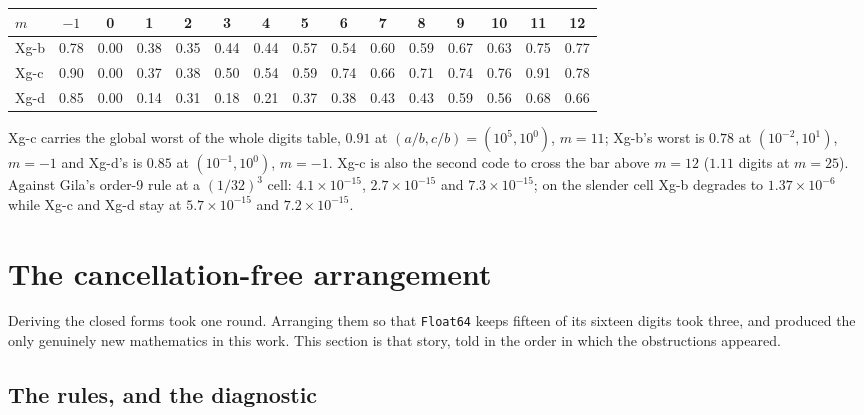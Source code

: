 \documentclass[11pt]{article}
\theoremstyle{remark}
\newcommand{\code}[1]{\texttt{#1}}
\begin{document}
\begin{center}\small
\begin{tabular}{@{}lcccccccccccccc@{}}
\toprule
$m$ & $-1$ & 0 & 1 & 2 & 3 & 4 & 5 & 6 & 7 & 8 & 9 & 10 & 11 & 12\\
\midrule
Xg-b & 0.78 & 0.00 & 0.38 & 0.35 & 0.44 & 0.44 & 0.57 & 0.54 & 0.60 & 0.59 & 0.67 & 0.63 & 0.75 & 0.77\\
Xg-c & 0.90 & 0.00 & 0.37 & 0.38 & 0.50 & 0.54 & 0.59 & 0.74 & 0.66 & 0.71 & 0.74 & 0.76 & 0.91 & 0.78\\
Xg-d & 0.85 & 0.00 & 0.14 & 0.31 & 0.18 & 0.21 & 0.37 & 0.38 & 0.43 & 0.43 & 0.59 & 0.56 & 0.68 & 0.66\\
\bottomrule
\end{tabular}
\end{center}
\noindent
Xg-c carries the global worst of the whole digits table, $0.91$ at
$(a/b, c/b) = (10^{5}, 10^{0})$, $m = 11$; Xg-b's worst is $0.78$ at
$(10^{-2}, 10^{1})$, $m = -1$ and Xg-d's is $0.85$ at $(10^{-1}, 10^{0})$, $m = -1$. Xg-c
is also the second code to cross the bar above $m = 12$ ($1.11$ digits at $m = 25$).
Against Gila's order-9 rule at a $(1/32)^3$ cell: $4.1\times10^{-15}$, $2.7\times10^{-15}$
and $7.3\times10^{-15}$; on the slender cell Xg-b degrades to $1.37\times10^{-6}$ while
Xg-c and Xg-d stay at $5.7\times10^{-15}$ and $7.2\times10^{-15}$.

\section{The cancellation-free arrangement}
\label{sec:cancel}

Deriving the closed forms took one round. Arranging them so that \code{Float64} keeps
fifteen of its sixteen digits took three, and produced the only genuinely new mathematics
in this work. This section is that story, told in the order in which the obstructions
appeared.

\subsection{The rules, and the diagnostic}
\label{sec:rules}
\end{document}
